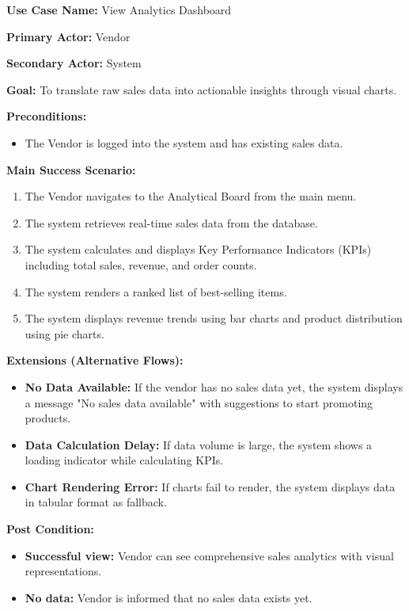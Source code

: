 \textbf{Use Case Name:} View Analytics Dashboard

\textbf{Primary Actor:} Vendor

\textbf{Secondary Actor:} System

\textbf{Goal:} To translate raw sales data into actionable insights through visual charts.

\textbf{Preconditions:}
\begin{itemize}
    \item The Vendor is logged into the system and has existing sales data.
\end{itemize}

\textbf{Main Success Scenario:}
\begin{enumerate}
    \item The Vendor navigates to the Analytical Board from the main menu.
    \item The system retrieves real-time sales data from the database.
    \item The system calculates and displays Key Performance Indicators (KPIs) including total sales, revenue, and order counts.
    \item The system renders a ranked list of best-selling items.
    \item The system displays revenue trends using bar charts and product distribution using pie charts.
\end{enumerate}

\textbf{Extensions (Alternative Flows):}
\begin{itemize}
    \item[2a.] \textbf{No Data Available:} If the vendor has no sales data yet, the system displays a message "No sales data available" with suggestions to start promoting products.
    
    \item[3a.] \textbf{Data Calculation Delay:} If data volume is large, the system shows a loading indicator while calculating KPIs.
    
    \item[5a.] \textbf{Chart Rendering Error:} If charts fail to render, the system displays data in tabular format as fallback.
\end{itemize}

\textbf{Post Condition:}
\begin{itemize}
    \item \textbf{Successful view:} Vendor can see comprehensive sales analytics with visual representations.
    \item \textbf{No data:} Vendor is informed that no sales data exists yet.
\end{itemize}

